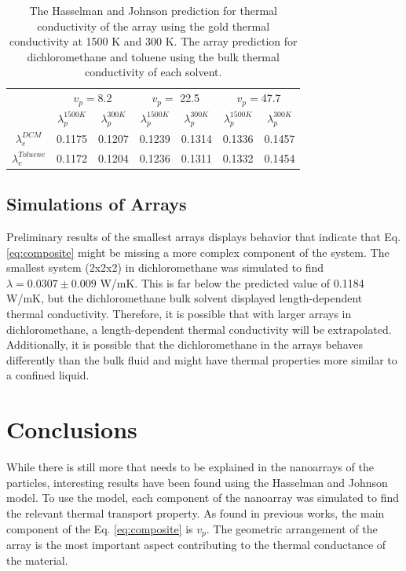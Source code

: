 \begin{table}
    \centering
    \begin{tabular}{c|cc|cc|cc}
    \toprule
        &\multicolumn{2}{c}{$v_p=$8.2} & \multicolumn{2}{|c}{$v_p=$ 22.5} & \multicolumn{2}{|c}{$v_p=$47.7}\\
        \vspace{5pt}
         &$\lambda_p^{1500 K}$ & $\lambda_p^{300 K}$ &$\lambda_p^{1500 K}$ & $\lambda_p^{300 K}$ &$\lambda_p^{1500 K}$ & $\lambda_p^{300 K}$  \\
         \hline
         $\lambda_e^{DCM}$& 0.1175& 0.1207& 0.1239& 0.1314& 0.1336& 0.1457\\
         $\lambda_e^{Toluene}$ & 0.1172 & 0.1204& 0.1236& 0.1311& 0.1332& 0.1454\\
         \bottomrule
    \end{tabular}
    \caption{The Hasselman and Johnson prediction for thermal conductivity of the  array using the gold thermal conductivity at 1500 K and 300 K. The array prediction for dichloromethane and toluene using the bulk thermal conductivity of each solvent.}
    \label{tab:predition}
\end{table}

\subsection{Simulations of Arrays}
Preliminary results of the smallest arrays displays behavior that indicate that Eq. \ref{eq:composite} might be missing a more complex component of the system.
The smallest system (2x2x2) in dichloromethane was simulated to find $\lambda = 0.0307 \pm 0.009$ W/mK. 
This is far below the predicted value of 0.1184 W/mK, but the dichloromethane bulk solvent displayed length-dependent thermal conductivity.
Therefore, it is possible that with larger arrays in dichloromethane, a length-dependent thermal conductivity will be extrapolated. 
Additionally, it is possible that the dichloromethane in the arrays behaves differently than the bulk fluid and might have thermal properties more similar to a confined liquid.

\section{Conclusions}
While there is still more that needs to be explained in the nanoarrays of the  particles, interesting results have been found using the Hasselman and Johnson model. 
To use the model, each component of the nanoarray was simulated to find the relevant thermal transport property. 
As found in previous works, the main component of the Eq. \ref{eq:composite} is $v_p$. 
The geometric arrangement of the array is the most important aspect contributing to the thermal conductance of the material.

